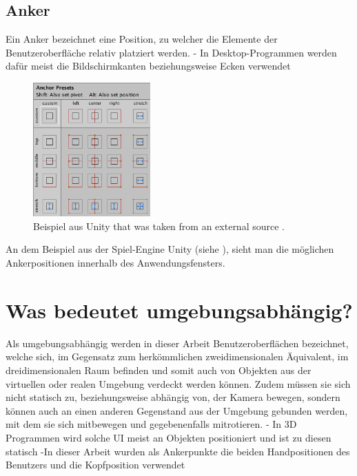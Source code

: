 		\subsection{Anker}
			Ein Anker bezeichnet eine Position, zu welcher die Elemente der Benutzeroberfläche relativ platziert werden.
			- In Desktop-Programmen werden dafür meist die Bildschirmkanten beziehungsweise Ecken verwendet
			\begin{figure}[htbp]
				\centering
				\includegraphics[width=0.4\textwidth]{figures/Ui_Anchor_Unity.png}
				\caption{Beispiel aus Unity that was taken from an external source .}
				\label{fig:unity}
			\end{figure}
			
			An dem Beispiel aus der Spiel-Engine Unity (siehe ), sieht man die möglichen Ankerpositionen innerhalb des Anwendungsfensters.  
	
	\section{Was bedeutet umgebungsabhängig?}
		Als umgebungsabhängig werden in dieser Arbeit Benutzeroberflächen bezeichnet, welche sich, im Gegensatz zum herkömmlichen zweidimensionalen Äquivalent, im dreidimensionalen Raum befinden und somit auch von Objekten aus der virtuellen oder realen Umgebung verdeckt werden können. Zudem müssen sie sich nicht statisch zu, beziehungsweise abhängig von, der Kamera bewegen, sondern können auch an einen anderen Gegenstand aus der Umgebung gebunden werden, mit dem sie sich mitbewegen und gegebenenfalls mitrotieren.
		- In 3D Programmen wird solche UI meist an Objekten positioniert und ist zu diesen statisch
		-In dieser Arbeit wurden als Ankerpunkte die beiden Handpositionen des Benutzers und die Kopfposition verwendet
	
